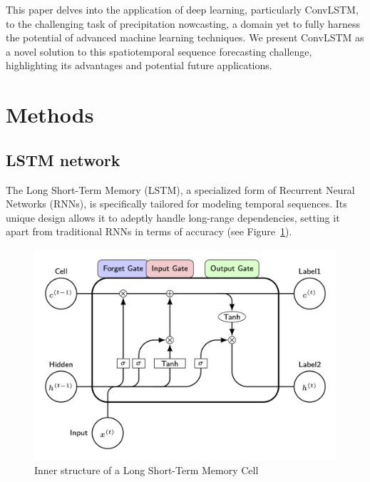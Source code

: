 \documentclass[
]{agujournal2019}
\begin{document}
This paper delves into the application of deep learning, particularly
ConvLSTM, to the challenging task of precipitation nowcasting, a domain
yet to fully harness the potential of advanced machine learning
techniques. We present ConvLSTM as a novel solution to this
spatiotemporal sequence forecasting challenge, highlighting its
advantages and potential future applications.

\hypertarget{methods}{%
\section{Methods}\label{methods}}

\hypertarget{lstm-network}{%
\subsection{LSTM network}\label{lstm-network}}

The Long Short-Term Memory (LSTM), a specialized form of Recurrent
Neural Networks (RNNs), is specifically tailored for modeling temporal
sequences. Its unique design allows it to adeptly handle long-range
dependencies, setting it apart from traditional RNNs in terms of
accuracy (see Figure~\ref{fig-lstm}).

\begin{figure}

{\centering \includegraphics{draw_lstm.png}

}

\caption{\label{fig-lstm}Inner structure of a Long Short-Term Memory
Cell}

\end{figure}
\end{document}
